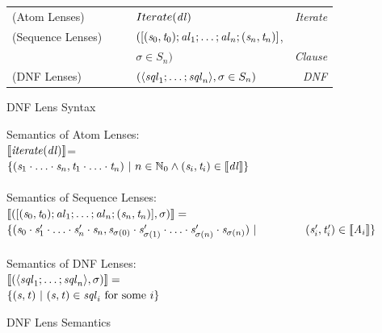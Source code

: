 \documentclass[numbers]{sigplanconf}
\begin{document}
\begin{figure}
  \centering
  \begin{tabular}{@{}l@{\ }l@{\ }c@{}l@{\ }>{\itshape\/}r@{}}
    (Atom Lenses) &\AtomLens{} & \GEq{} & $Iterate(\mathit{dl})$ & Iterate\\
    (Sequence Lenses) &\SequenceLens{} & \GEq{} &
                                                  $([(\mathit{s}_0,\mathit{t}_0);\mathit{al}_1;\ldots;\mathit{al}_n;(\mathit{s}_n,\mathit{t}_n)]$, &\\
                  & & & $\sigma \in S_n)$ & Clause\SubN{}\\
    (DNF Lenses)& \DNFLens{} & \GEq{} & $(\langle\mathit{sql}_1;\ldots;\mathit{sql}_n\rangle, \sigma \in S_n)$ & DNF\SubN{}\\
  \end{tabular}
  \caption{DNF Lens Syntax}
  \label{fig:dnf-lens-syntax}
\end{figure}

\begin{figure}
  Semantics of Atom Lenses:\\
  $[ \! [\mathit{iterate(\mathit{dl})}] \! ]$=\\
  \hspace*{3em}$\{(\mathit{s}_1\cdot\ldots\cdot\mathit{s}_n,
    \mathit{t}_1\cdot\ldots\cdot\mathit{t}_n)~|~
    n\in\mathbb{N}_0\wedge(\mathit{s}_i,\mathit{t}_i)\in[ \! [\mathit{dl}] \! ]\}$\\
  \\
  Semantics of Sequence Lenses:\\
  $[ \! [([(\mathit{s}_0,\mathit{t}_0);
      \mathit{al}_1;\ldots;\mathit{al}_n
      ;(\mathit{s}_n,\mathit{t}_n)],\sigma)] \! ]=$\\
  \hspace*{3em}$\SetOf{
    (\String_0\Concat\String_1'\Concat\ldots\Concat\String_n'\Concat\String_n,
    \String_{\Permutation(0)}\Concat\String_{\Permutation(1)}'\Concat\ldots
    \Concat\String_{\Permutation(n)}'\Concat\String_{\Permutation(n)})\SuchThat$\\
    \hspace*{4em}$(\String_i',\StringAlt_i')\in\SemanticsOf{\Atom_i}}$\\
  \\
  Semantics of DNF Lenses:\\
  $[ \! [(\langle\mathit{sql}_1;\ldots;
      \mathit{sql}_n\rangle,\sigma)] \! ]=$\\
  \hspace*{3em}$\{(\mathit{s},\mathit{t})~|~
    (\mathit{s},\mathit{t})\in\mathit{sql}_i\text{ for some $i$}\}$
  \caption{DNF Lens Semantics}
  \label{fig:dnf-lens-semantics}
\end{figure}
\end{document}
